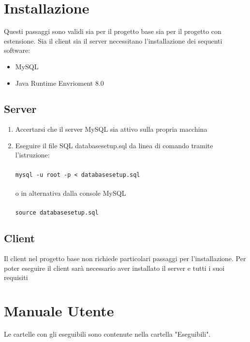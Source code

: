 \documentclass{article}
\begin{document}
    \newpage
    \section{Installazione}
    Questi passaggi sono validi sia per il progetto base sia per il progetto con
    estensione.
    Sia il client sia il server necessitano l'installazione dei sequenti
    software:
        \begin{itemize}
            \item MySQL
            \item Java Runtime Envrioment 8.0
        \end{itemize}

        \subsection{Server}
            \begin{enumerate}
                \item Accertarsi che il server MySQL sia attivo sulla propria
                macchina
                \item Eseguire il file SQL databasesetup.sql
                da linea di comando tramite l'istruzione:
                    \\\\
                    \verb|mysql -u root -p < databasesetup.sql| \\\\
                    o in alternativa dalla console MySQL \\\\
                    \verb|source databasesetup.sql|
                
                
            \end{enumerate}

        \subsection{Client}
        Il client nel progetto base non
        richiede particolari passaggi per l'installazione. Per poter eseguire il 
        client sarà necessario aver installato il server e tutti i suoi
         requisiti
    
    \section{Manuale Utente}
    Le cartelle con gli eseguibili sono contenute nella cartella "Eseguibili".
   
\end{document}

